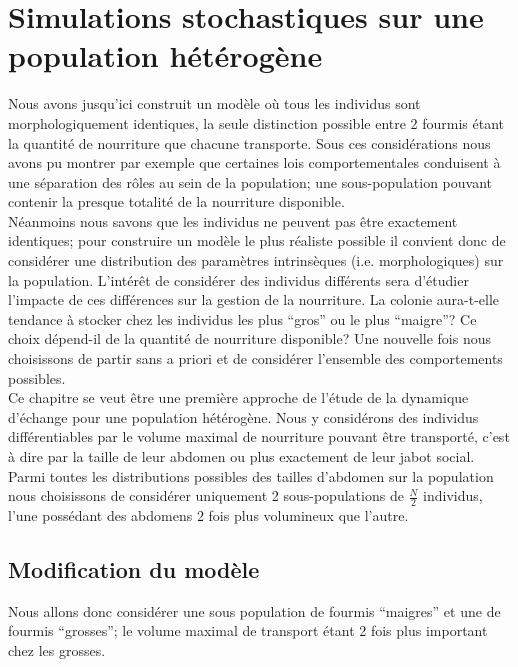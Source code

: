 
\chapter{Simulations stochastiques sur une population hétérogène}

Nous avons jusqu'ici construit un modèle où tous les individus sont morphologiquement identiques, la seule distinction possible entre 2 fourmis étant la quantité de nourriture que chacune transporte. Sous ces considérations nous avons pu montrer par exemple que certaines lois comportementales conduisent à une séparation des rôles au sein de la population; une sous-population pouvant contenir la presque totalité de la  nourriture disponible.\\

Néanmoins nous savons que les individus ne peuvent pas être exactement identiques; pour construire un modèle le plus réaliste possible il convient donc de considérer une distribution des paramètres intrinsèques (i.e. morphologiques) sur la population. L'intérêt de considérer des individus différents sera d'étudier l'impacte de ces différences sur la gestion de la nourriture. La colonie aura-t-elle tendance à stocker chez les individus les plus ``gros'' ou le plus ``maigre''? Ce choix dépend-il de la quantité de nourriture disponible? Une nouvelle fois nous choisissons de partir sans a priori et de considérer l'ensemble des comportements possibles.\\

Ce chapitre se veut être une première approche de l'étude de la dynamique d'échange pour une population hétérogène. Nous y considérons des individus différentiables par le volume maximal de nourriture pouvant être transporté, c'est à dire par la taille de leur abdomen ou plus exactement de leur jabot social. Parmi toutes les distributions possibles des tailles d'abdomen sur la population nous choisissons de considérer uniquement   2 sous-populations de $\frac{N}{2}$ individus, l'une possédant des abdomens $2$ fois plus volumineux que l'autre.

\section{Modification du modèle}

Nous allons donc considérer une sous population de fourmis ``maigres'' et une de fourmis ``grosses''; le volume maximal de transport étant 2 fois plus important chez les grosses. \\

